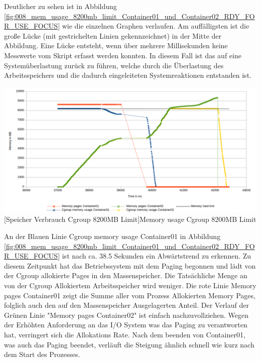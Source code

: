 Deutlicher zu sehen ist in Abbildung \ref{fig:008_mem_usage_8200mb_limit_Container01_und_Container02_RDY_FOR_USE_FOCUS} wie die einzelnen Graphen verlaufen. Am auffälligsten ist die große Lücke (mit gestrichelten Linien gekennzeichnet) in der Mitte der Abbildung. Eine Lücke entsteht, wenn über mehrere Millisekunden keine Messwerte vom Skript erfasst werden konnten. In diesem Fall ist das auf eine Systemüberlastung zurück zu führen, welche durch die Überlastung des Arbeitsspeichers und die dadurch eingeleiteten Systemreaktionen entstanden ist. 

\vspace{1em}
\begin{minipage}{\linewidth}
	\centering
	\includegraphics[width=1\linewidth]{pics/008_mem_usage_8200mb_limit_Container01_und_Container02_RDY_FOR_USE_FOCUS.png}
	[Speicher Verbrauch Cgroup 8200MB Limit]{Memory usage Cgroup 8200MB Limit}
	\label{fig:008_mem_usage_8200mb_limit_Container01_und_Container02_RDY_FOR_USE_FOCUS}
\end{minipage}



An der Blauen Linie \glqq{}Cgroup memory usage Container01\grqq{} in Abbildung \ref{fig:008_mem_usage_8200mb_limit_Container01_und_Container02_RDY_FOR_USE_FOCUS} ist nach ca. 38.5 Sekunden ein Abwärtstrend zu erkennen. Zu diesem Zeitpunkt hat das Betriebssystem mit dem Paging begonnen und lädt von der Cgroup allokierte Pages in den Massenspeicher. Die Tatsächliche Menge an von der Cgroup Allokiertem Arbeitsspeicher wird weniger. Die rote Linie \glqq{}Memory pages Container01\grqq{} zeigt die Summe aller vom Prozess Allokierten Memory Pages, folglich auch den auf den Massenspeicher Ausgelagerten Anteil. Der Verlauf der Grünen Linie "Memory pages Container02" ist einfach nachzuvollziehen. Wegen der Erhöhten Anforderung an das I/O System was das Paging zu verantworten hat, verringert sich die Allokations Rate. Nach dem beenden von Container01, was auch das Paging beendet, verläuft die Steigung ähnlich schnell wie kurz nach dem Start des Prozesses. 


